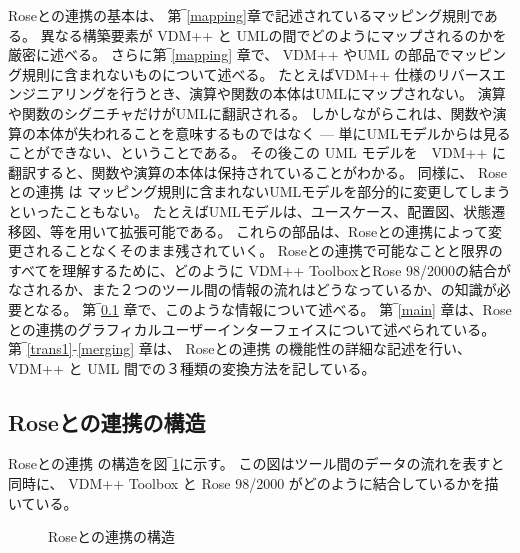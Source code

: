 \documentclass[\pformat,12pt]{jarticle}
\newcommand{\vdmpp}{VDM++}
\newcommand{\link}{Roseとの連携}
\newcommand{\rose}{Rose 98/2000}
\begin{document}
 \link{}の基本は、 第‾\ref{mapping}章で記述されているマッピング規則である。
異なる構築要素が \vdmpp{} と UMLの間でどのようにマップされるのかを厳密に述べる。
さらに第‾\ref{mapping} 章で、 \vdmpp{} やUML の部品でマッピング規則に含まれないものについて述べる。
たとえば\vdmpp{} 仕様のリバースエンジニアリングを行うとき、演算や関数の本体はUMLにマップされない。
演算や関数のシグニチャだけがUMLに翻訳される。
しかしながらこれは、関数や演算の本体が失われることを意味するものではなく --- 単にUMLモデルからは見ることができない、ということである。
その後この UML モデルを　\vdmpp{} に翻訳すると、関数や演算の本体は保持されていることがわかる。
同様に、 \link{} は マッピング規則に含まれないUMLモデルを部分的に変更してしまうといったこともない。 
たとえばUMLモデルは、ユースケース、配置図、状態遷移図、等を用いて拡張可能である。 
これらの部品は、\link{}によって変更されることなくそのまま残されていく。
\link{}で可能なことと限界のすべてを理解するために、どのように \vdmpp{} Toolboxと\rose{}の結合がなされるか、また２つのツール間の情報の流れはどうなっているか、の知識が必要となる。
第‾\ref{architecture} 章で、このような情報について述べる。
第‾\ref{main} 章は、\link{}のグラフィカルユーザーインターフェイスについて述べられている。
第‾\ref{trans1}-\ref{merging} 章は、 \link{} の機能性の詳細な記述を行い、\vdmpp{} と UML 間での３種類の変換方法を記している。

\subsection{\link{}の構造} \label{architecture}  

 \link{} の構造を図‾\ref{fig:architecture}に示す。
この図はツール間のデータの流れを表すと同時に、 \vdmpp{} Toolbox と \rose{} がどのように結合しているかを描いている。

\begin{figure}[htb]
\begin{center}
\mbox{}
\caption{\link{}の構造　\label{fig:architecture}}
\end{center}
\end{figure}
\end{document}
